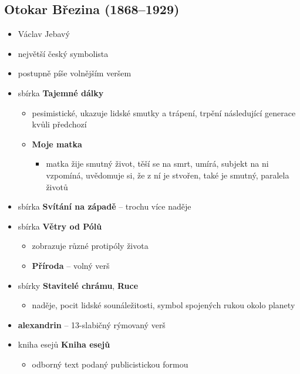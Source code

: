 \subsection{Otokar Březina (1868--1929)}
\begin{itemize}
\item Václav Jebavý
\item největší český symbolista 
\item postupně píše volnějším veršem
\item sbírka \textbf{Tajemné dálky}
	\begin{itemize}
	\item pesimistické, ukazuje lidské smutky a trápení, trpění následující generace kvůli předchozí
	\item \textbf{Moje matka}
		\begin{itemize}
		\item matka žije smutný život, těší se na smrt, umírá, subjekt na ni vzpomíná, uvědomuje si, že z ní je stvořen, také je smutný, paralela životů
		\end{itemize}
	\end{itemize}
\item sbírka \textbf{Svítání na západě} -- trochu více naděje
\item sbírka \textbf{Větry od Pólů}
	\begin{itemize}
	\item zobrazuje různé protipóly života
	\item \textbf{Příroda} -- volný verš
	\end{itemize}
\item sbírky \textbf{Stavitelé chrámu}, \textbf{Ruce}
	\begin{itemize}
	\item naděje, pocit lidské sounáležitosti, symbol spojených rukou okolo planety
	\end{itemize}
\item \textbf{alexandrin} -- 13-slabičný rýmovaný verš
\item kniha esejů \textbf{Kniha esejů}
	\begin{itemize}
	\item odborný text podaný publicistickou formou
	\end{itemize}
\end{itemize}

